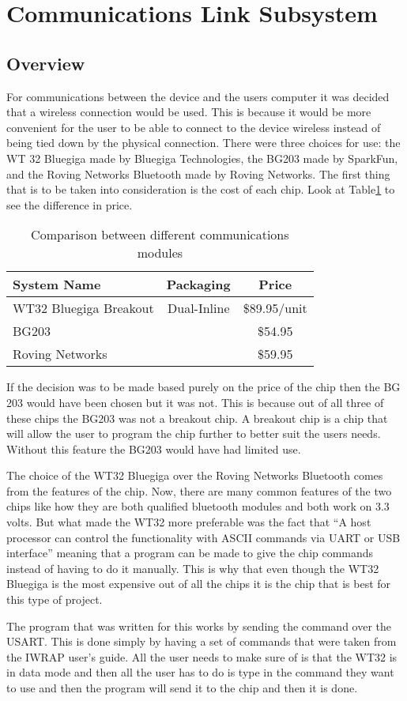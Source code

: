 \section[Wireless Communication]{Communications Link Subsystem}
\subsection{Overview}
For communications between the device and the users computer it was decided 
that a wireless connection would be used.  This is because it would be more 
convenient for the user to be able to connect to the device wireless instead of
 being tied down by the physical connection.  There were three choices for use:
 the WT 32 Bluegiga made by Bluegiga Technologies, the BG203 made by SparkFun, 
and the Roving Networks Bluetooth made by Roving Networks.  The first thing 
that is to be taken into consideration is the cost of each chip. Look at 
Table\ref{tab:bt_prices} to see the difference in price.

\begin{table}[hbp]
\caption{Comparison between different communications modules \cite{web:wt32-price}\cite{web:bg203-price}\cite{web:roving-price}}
\begin{tabular}{l | c c } 
	System Name & Packaging & Price \\\hline
	WT32 Bluegiga Breakout & Dual-Inline & \$89.95/unit \\
	BG203 & & \$54.95 \\
	Roving Networks & & \$59.95
\end{tabular}
\label{tab:bt_prices}
\end{table}

If the decision was to be made based purely on the price of the chip then the 
BG 203 would have been chosen but it was not.  This is because out of all three
 of these chips the BG203 was not a breakout chip.  A breakout chip is a chip 
that will allow the user to program the chip further to better suit the users 
needs.  Without this feature the BG203 would have had limited use.

The choice of the WT32 Bluegiga over the Roving Networks Bluetooth comes from 
the features of the chip.  Now, there are many common features of the two chips
 like how they are both qualified bluetooth modules and both work on 3.3 volts.
  But what made the WT32 more preferable was the fact that ``A host processor 
can control the functionality with ASCII commands via UART or USB 
interface'' meaning that a program can be made to give the chip commands 
instead of having to do it manually\cite{web:wt32-price}.  This is why that 
even though the WT32 Bluegiga is the most expensive out of all the chips it is 
the chip that is best for this type of project.

The program that was written for this works by sending the command over the USART.  This is done simply by having a set of commands that were taken from the 
IWRAP user's guide.  All the user needs to make sure of is that the WT32 is in data mode and then all the user has to do is type in the command they want to use and then the program will send it to the chip and then it is done.
